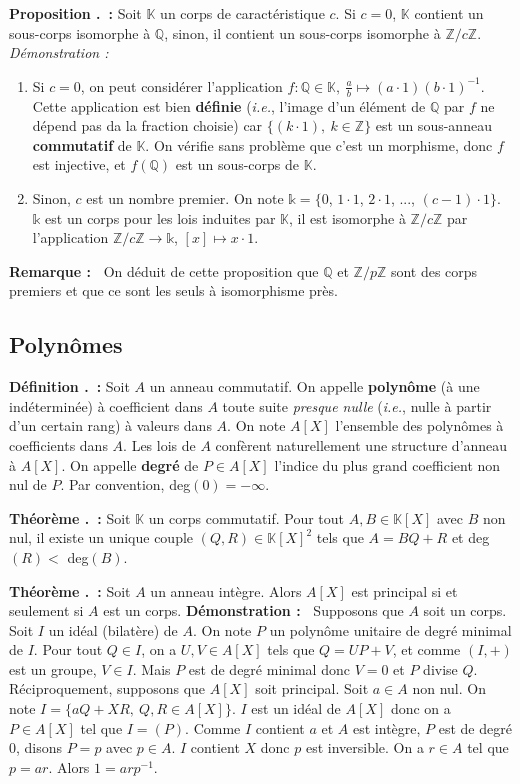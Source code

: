 \documentclass[5pt,a4paper]{article}
\newcounter{prop}[section]
\newcounter{defin}[section]
\newcounter{thm}[section]
\renewcommand{\theprop}{\thesection.\arabic{prop}}
\renewcommand{\thedefin}{\thesection.\arabic{defin}}
\renewcommand{\thethm}{\thesection.\arabic{thm}}
\newcommand{\prop}[1]{\stepcounter{prop}\noindent\textbf{Proposition \theprop ~:} #1 \newline}
\newcommand{\defin}[1]{\stepcounter{defin}\noindent\textbf{Définition \thedefin ~:} #1 \newline}
\newcommand{\thm}[1]{\stepcounter{thm}\noindent\textbf{Théorème \thethm ~:} #1 \newline}
\newcommand{\demo}[1]{\textbf{Démonstration :~} #1 \newline}
\newcommand{\demoEnum}[1]{\textit{Démonstration :~} #1}
\newcommand{\rmq}[1]{\textbf{Remarque :~} #1 \newline}
\begin{document}
\begin{onehalfspacing}
\prop{Soit $\mathbb{K}$ un corps de caractéristique $c$. Si $c = 0$, $\mathbb{K}$ contient un sous-corps isomorphe à $\mathbb{Q}$, sinon, il contient un sous-corps isomorphe à $\mathbb{Z}/c\mathbb{Z}$.}
\demoEnum{ 
	\begin{enumerate}
	\item Si $c = 0$, on peut considérer l'application $f : \mathbb{Q} \in \mathbb{K},~\frac{a}{b} \mapsto (a \cdot 1)(b \cdot 1)^{-1}$. Cette application est bien \textbf{définie} (\textit{i.e.}, l'image d'un élément de $\mathbb{Q}$ par $f$ ne dépend pas da la fraction choisie) car $\{(k \cdot 1),~k\in \mathbb{Z}\}$ est un sous-anneau \textbf{commutatif} de $\mathbb{K}$. On vérifie sans problème que c'est un morphisme, donc $f$ est injective, et $f(\mathbb{Q})$ est un sous-corps de $\mathbb{K}$.
	\item Sinon, $c$ est un nombre premier. On note $\mathds{k} = \{0$, $1 \cdot 1$, $2 \cdot 1$, ..., $		(c-1) \cdot 1\}$. $\mathds{k}$ est un corps pour les lois induites par $\mathbb{K}$, il est isomorphe à $\mathbb{Z}/c\mathbb{Z}$ par l'application $\mathbb{Z}/	c\mathbb{Z} \rightarrow \mathds{k}$, $[x] \mapsto x \cdot 1$. 
	\end{enumerate}
}
\rmq{On déduit de cette proposition que $\mathbb{Q}$ et $\mathbb{Z}/p\mathbb{Z}$ sont des corps premiers et que ce sont les seuls à isomorphisme près.}


\subsection{Polynômes}

\defin{Soit $A$ un anneau commutatif. On appelle \textbf{polynôme} (à une indéterminée) à coefficient dans $A$ toute suite \textit{presque nulle} (\textit{i.e.}, nulle à partir d'un certain rang) à valeurs dans $A$. On note $A[X]$ l'ensemble des polynômes à coefficients dans $A$. Les lois de $A$ confèrent naturellement une structure d'anneau à $A[X]$. On appelle \textbf{degré} de $P \in A[X]$ l'indice du plus grand coefficient non nul de $P$. Par convention, deg$(0) = -\infty$.}


\thm{Soit $\mathbb{K}$ un corps commutatif. Pour tout $A, B \in \mathbb{K}[X]$ avec $B$ non nul, il existe un unique couple $(Q, R) \in \mathbb{K}[X]^2$ tels que $A = BQ + R$ et deg$(R) <$ deg$(B)$.}


\thm{Soit $A$ un anneau intègre. Alors $A[X]$ est principal si et seulement si $A$ est un corps.}
\demo{Supposons que $A$ soit un corps. Soit $I$ un idéal (bilatère) de $A$. On note $P$ un polynôme unitaire de degré minimal de $I$. Pour tout $Q \in I$, on a $U, V \in A[X]$ tels que $Q = UP + V$, et comme $(I, +)$ est un groupe, $V \in I$. Mais $P$ est de degré minimal donc $V = 0$ et $P$ divise $Q$. Réciproquement, supposons que $A[X]$ soit principal. Soit $a \in A$ non nul. On note $I = \{aQ + XR,~Q,R \in A[X]\}$. $I$ est un idéal de $A[X]$ donc on a $P \in A[X]$ tel que $I = (P)$. Comme $I$ contient $a$ et $A$ est intègre, $P$ est de degré $0$, disons $P = p$ avec $p \in A$. $I$ contient $X$ donc $p$ est inversible. On a $r \in A$ tel que $p = ar$. Alors $1 = arp^{-1}$.}



\end{onehalfspacing}
\end{document}
